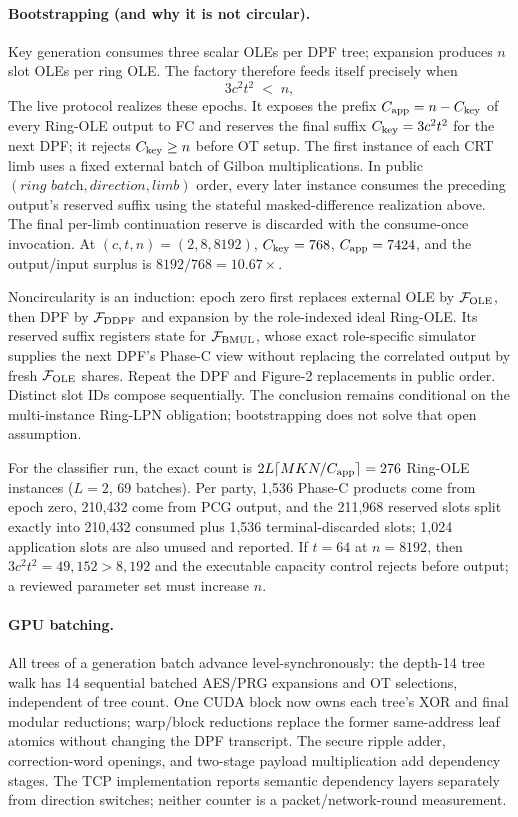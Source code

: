 \documentclass[11pt]{article}
\begin{document}
\paragraph{Bootstrapping (and why it is not circular).} Key generation
consumes three scalar OLEs per DPF tree; expansion produces $n$ slot OLEs per
ring OLE. The factory therefore feeds itself precisely when
\begin{equation}
3c^2 t^2 \;<\; n,
\label{eq:bootstrap}
\end{equation}
The live protocol realizes these epochs. It exposes the prefix
$C_{\rm app}=n-C_{\rm key}$ of every Ring-OLE output to FC and reserves the
final suffix
$C_{\rm key}=3c^2t^2$ for the next DPF; it rejects $C_{\rm key}\ge n$ before OT
setup. The first instance of each CRT limb uses a fixed external batch of
Gilboa multiplications. In public $(\textit{ring batch},\textit{direction},
\textit{limb})$ order, every later instance consumes the preceding output's
reserved suffix using the stateful masked-difference realization above. The final
per-limb continuation reserve is discarded with the consume-once invocation.
At $(c,t,n)=(2,8,8192)$, $C_{\rm key}=768$,
$C_{\rm app}=7424$, and the output/input surplus is
$8192/768=10.67\times$.

Noncircularity is an induction: epoch zero first replaces external OLE by
$\mathcal F_{\rm OLE}$, then DPF by $\mathcal F_{\rm DDPF}$ and expansion by
the role-indexed ideal Ring-OLE. Its reserved suffix registers state for
$\mathcal F_{\rm BMUL}$, whose exact role-specific simulator supplies the next
DPF's Phase-C view without replacing the correlated output by fresh
$\mathcal F_{\rm OLE}$ shares. Repeat the DPF and Figure-2 replacements in
public order. Distinct slot IDs compose sequentially. The conclusion remains
conditional on the multi-instance Ring-LPN obligation; bootstrapping does not
solve that open assumption.

For the classifier run, the exact count is
$2L\lceil MKN/C_{\rm app}\rceil=276$ Ring-OLE instances
($L=2$, 69 batches). Per party, 1{,}536 Phase-C products come from epoch zero,
210{,}432 come from PCG output, and the 211{,}968 reserved slots split exactly
into 210{,}432 consumed plus 1{,}536 terminal-discarded slots; 1{,}024
application slots are also unused and reported. If $t=64$ at $n=8192$, then
$3c^2t^2=49{,}152>8{,}192$ and the executable capacity control rejects before
output; a reviewed parameter set must increase $n$.


\paragraph{GPU batching.} All trees of a generation batch advance
level-synchronously: the depth-14 tree walk has 14 sequential batched
AES/PRG expansions and OT selections, independent of tree count. One CUDA
block now owns each tree's XOR and final modular reductions; warp/block
reductions replace the former same-address leaf atomics without changing the
DPF transcript. The secure ripple adder, correction-word openings, and
two-stage payload multiplication add dependency stages. The TCP implementation
reports semantic dependency layers separately from direction switches; neither
counter is a packet/network-round measurement.
\end{document}
